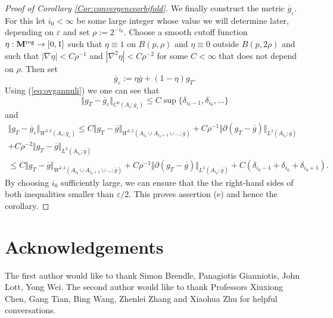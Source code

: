 \documentclass[11pt]{amsart}
\numberwithin{equation}{section}
\def\eps{\varepsilon}
\def\M{{\bf M}}
\def\eps{\varepsilon}
\numberwithin{equation}{section}
\begin{document}
\begin{proof}[Proof of Corollary \ref{Cor:convergenceorbifold}]
We finally construct the metric $\overline{g}_\eps$.
For this let $i_0 < \infty$ be some large integer whose value we will determine later, depending on $\eps$ and set $\rho := 2^{-i_0}$.
Choose a smooth cutoff function $\eta : \M^{\textnormal{reg}} \to [0,1]$ such that $\eta \equiv 1$ on $B(p, \rho)$ and $\eta \equiv 0$ outside $B(p, 2 \rho)$ and such that $|\nabla \eta| < C \rho^{-1}$ and $|\nabla^2 \eta| < C \rho^{-2}$ for some $C < \infty$ that does not depend on $\rho$.
Then set 
\[ \overline{g}_\eps := \eta \overline{g} + ( 1- \eta  ) g_T. \]
Using (\ref{eq:ovgannuli}) we one can see that
\[ \Vert g_T - \overline{g}_\eps \Vert_{C^0(A_i; \overline{g}_\eps)} \leq C \sup \{ \delta_{i_{0}-1}, \delta_{i_0 }, \ldots \} \] 
and
\begin{multline*}
 \Vert g_T - \overline{g}_\eps \Vert_{W^{2,2}(A_i; \overline{g}_\eps)} \leq C  \Vert g_T - \overline{g} \Vert_{W^{2,2}(A_{i_0} \cup A_{i_0 + 1} \cup \ldots ; \overline{g})} + C \rho^{-1} \Vert \partial (g_T - \overline{g}) \Vert_{L^2(A_{i_0}  ; \overline{g})} \\
 + C \rho^{-2} \Vert g_T - \overline{g} \Vert_{L^2(A_{i_0}  ; \overline{g})}  \\
\leq C  \Vert g_T - \overline{g} \Vert_{W^{2,2}(A_{i_0} \cup A_{i_0 + 1} \cup \ldots ; \overline{g})} + C \rho^{-1} \Vert \partial (g_T - \overline{g}) \Vert_{L^2(A_{i_0}  ; \overline{g})} + C ( \delta_{i_0-1}+ \delta_{i_0}+ \delta_{i_0+1}).
\end{multline*}
By choosing $i_0$ sufficiently large, we can ensure that the the right-hand sides of both inequalities smaller than $\eps/2$.
This proves assertion (e) and hence the corollary.
\end{proof}



\section*{Acknowledgements}
The first author would like to thank Simon Brendle, Panagiotis Gianniotis, John Lott, Yong Wei.
The second author would like to thank Professors Xiuxiong Chen, Gang Tian, Bing Wang, Zhenlei Zhang and Xiaohua Zhu for helpful conversations.
\end{document}
